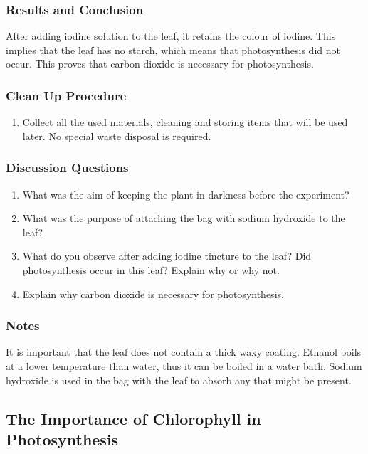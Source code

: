 \subsubsection*{Results and Conclusion}
After adding iodine solution to the leaf, it retains the colour of iodine. This implies that the leaf has no starch, which means that photosynthesis did not occur. This proves that carbon dioxide is necessary for photosynthesis.

\subsubsection*{Clean Up Procedure}
\begin{enumerate}
\item{Collect all the used materials, cleaning and storing items that will be used later. No special waste disposal is required.}
\end{enumerate}

\subsubsection*{Discussion Questions}
\begin{enumerate}
\item{What was the aim of keeping the plant in darkness before the experiment?}
\item{What was the purpose of attaching the bag with sodium hydroxide to the leaf?}
\item{What do you observe after adding iodine tincture to the leaf? Did photosynthesis occur in this leaf? Explain why or why not.}
\item{Explain why carbon dioxide is necessary for photosynthesis.}
\end{enumerate}

\subsubsection*{Notes}
It is important that the leaf does not contain a thick waxy coating. Ethanol boils at a lower temperature than water, thus it can be boiled in a water bath. Sodium hydroxide is used in the bag with the leaf to absorb any  that might be present.

\subsection{The Importance of Chlorophyll in Photosynthesis}

